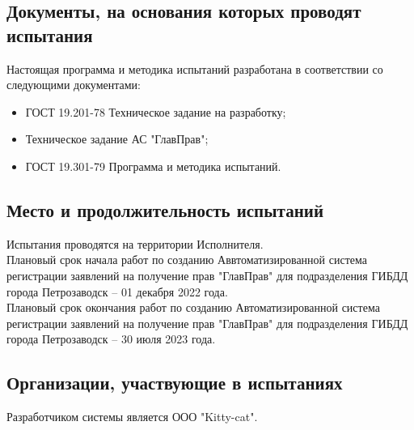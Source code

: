 \documentclass[russian, utf8, 12pt,pointsubsection,floatsubsection]{eskdtext}
\begin{document}

\subsection{Документы, на основания которых проводят испытания}

Настоящая программа и методика испытаний разработана в соответствии со следующими документами: 
\begin{itemize}
    \item ГОСТ 19.201-78 Техническое задание на разработку; 
    \item Техническое задание АС "ГлавПрав";
    \item ГОСТ 19.301-79 Программа и методика испытаний.
\end{itemize}

\subsection{Место и продолжительность испытаний}
Испытания проводятся на территории Исполнителя.\\

Плановый срок начала работ по созданию Аввтоматизированной система регистрации заявлений на получение прав "ГлавПрав" для подразделения ГИБДД города Петрозаводск – 01 декабря 2022 года.\\

Плановый срок окончания работ по созданию Автоматизированной система регистрации заявлений на получение прав "ГлавПрав" для подразделения ГИБДД города Петрозаводск – 30 июля 2023 года.\\

\subsection{Организации, участвующие в испытаниях}
Разработчиком системы является ООО "Kitty-cat".\\
\end{document}
